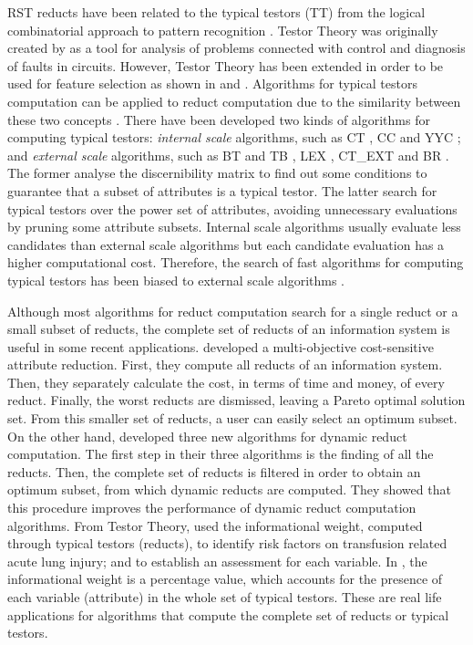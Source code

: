\documentclass[authoryear,preprint,review,12pt]{elsarticle}
\begin{document}
  RST reducts have been related to the typical testors (TT) from the logical combinatorial approach 
  to pattern recognition \citep{Chikalov2013}. Testor Theory was originally created by \cite{Cheguis55} as a tool
  for analysis of problems connected with control and diagnosis of faults in circuits. 
  However, Testor Theory has been extended in order to be used for feature selection as shown in \citep{Ruiz08}
  and \citep{Martinez01}. Algorithms for typical testors computation can be applied to reduct computation due to the similarity between these two concepts \citep{Lazo15}. There have been developed two kinds of algorithms for
  computing typical testors: \emph{internal scale} algorithms, such as CT \citep{Bravo83}, CC \citep{Aguila84} 
  and YYC \citep{Alba14}; and \emph{external scale} algorithms, such as BT and TB \citep{Ruiz85}, LEX
  \citep{Santiesteban03}, CT\_EXT \citep{Sanchez07} and BR \citep{Lias09}. The former analyse the discernibility
  matrix to find out some conditions to guarantee that a subset of attributes is a typical testor. The latter
  search for typical testors over the power set of attributes, avoiding unnecessary evaluations by pruning
  some attribute subsets. Internal scale algorithms usually evaluate less candidates than external scale
  algorithms but each candidate evaluation has a higher computational cost. Therefore, the search of fast 
  algorithms for computing typical testors has been biased to external scale algorithms \citep{Alba14}.
    
  Although most algorithms for reduct computation search for a single reduct or a small subset of reducts, 
  the complete set of reducts of an information system is useful in some recent applications. \cite{Xu2013}
  developed a multi-objective cost-sensitive attribute reduction. First, they compute all reducts of an 
  information system. Then, they separately calculate the cost, in terms of time and money, of every reduct. 
  Finally, the worst reducts are dismissed, leaving a Pareto optimal solution set. From this smaller set of 
  reducts, a user can easily select an optimum subset. On the other hand, \cite{Mukamakuza2014} developed 
  three new algorithms for dynamic reduct computation. 
  The first step in their three algorithms is the finding of all the reducts. Then, the complete set of reducts 
  is filtered in order to obtain an optimum subset, from which dynamic reducts are computed. They showed that 
  this procedure improves the performance of dynamic reduct computation algorithms.	
  From Testor Theory, \cite{Torres2014} used the informational weight, computed through typical testors 
  (reducts), to identify risk factors on transfusion related acute lung injury; and to establish an assessment
  for each variable.  In \citep{Torres2014}, the informational weight is a percentage value, which accounts 
  for the presence of each variable (attribute) in the whole set of typical testors. These are real life
  applications for algorithms that compute the complete set of reducts or typical testors.	
	
\end{document}
